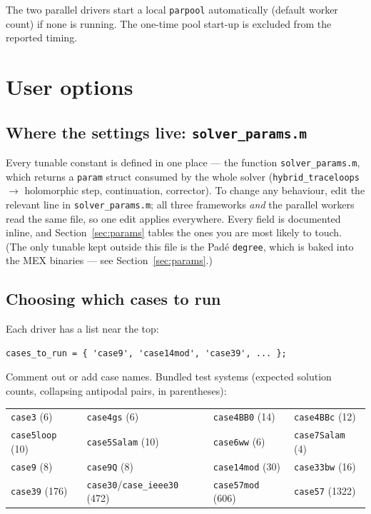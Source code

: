 \documentclass[11pt,a4paper]{article}
\newcommand{\code}[1]{\texttt{#1}}
\begin{document}
The two parallel drivers start a local \code{parpool} automatically (default worker
count) if none is running. The one-time pool start-up is excluded from the reported
timing.

\section{User options}

\subsection{Where the settings live: \code{solver_params.m}}
Every tunable constant is defined in one place --- the function \code{solver_params.m},
which returns a \code{param} struct consumed by the whole solver (\code{hybrid_traceloops}
$\to$ holomorphic step, continuation, corrector). To change any behaviour, edit the
relevant line in \code{solver_params.m}; all three frameworks \emph{and} the parallel
workers read the same file, so one edit applies everywhere. Every field is documented
inline, and Section~\ref{sec:params} tables the ones you are most likely to touch. (The
only tunable kept outside this file is the Pad\'e \code{degree}, which is baked into the
MEX binaries --- see Section~\ref{sec:params}.)

\subsection{Choosing which cases to run}
Each driver has a list near the top:
\begin{lstlisting}[style=mat]
cases_to_run = { 'case9', 'case14mod', 'case39', ... };
\end{lstlisting}
Comment out or add case names. Bundled test systems (expected solution counts, collapsing
antipodal pairs, in parentheses):

\begin{center}\small
\begin{tabular}{@{}llll@{}}
\toprule
\code{case3} (6) & \code{case4gs} (6) & \code{case4BB0} (14) & \code{case4BBc} (12)\\
\code{case5loop} (10) & \code{case5Salam} (10) & \code{case6ww} (6) & \code{case7Salam} (4)\\
\code{case9} (8) & \code{case9Q} (8) & \code{case14mod} (30) & \code{case33bw} (16)\\
\code{case39} (176) & \code{case30}/\code{case_ieee30} (472) & \code{case57mod} (606) & \code{case57} (1322)\\
\bottomrule
\end{tabular}
\end{center}
\end{document}
